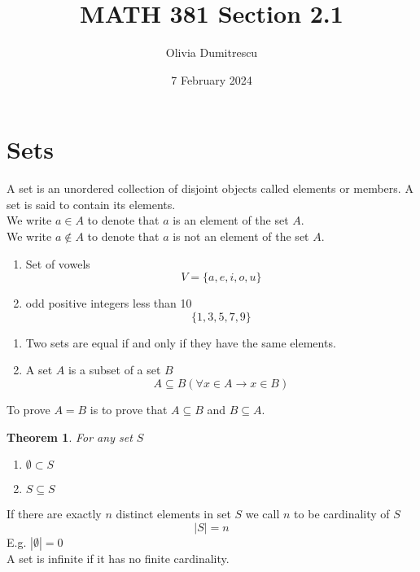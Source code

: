 \documentclass[letterpaper, 12pt]{article}
\title{MATH 381 Section 2.1}
\author{Olivia Dumitrescu}
\date{7 February 2024}
\newtheorem{theorem}{Theorem}[section]
\newenvironment{definition}[1][Definition]{\begin{trivlist}
\item[\hskip \labelsep {\bfseries #1}]}{\end{trivlist}}
\newenvironment{example}[1][Example]{\begin{trivlist}
\item[\hskip \labelsep {\bfseries #1}]}{\end{trivlist}}
\newenvironment{remark}[1][Remark]{\begin{trivlist}
\item[\hskip \labelsep {\bfseries #1}]}{\end{trivlist}}
\newcommand{\then}{\rightarrow}
\begin{document}
    \maketitle
    \section*{Sets}
    \begin{definition}
        A set is an unordered collection of disjoint objects called elements or members.
        A set is said to contain its elements. \\
        We write $a \in A$ to denote that $a$ is an element of the set $A$. \\
        We write $a \notin A$ to denote that $a$ is not an element of the set $A$.
    \end{definition}
    \begin{example}
        \hfil
        \begin{enumerate}
            \item Set of vowels
            \[V = \{a, e, i, o, u\}\]
            \item odd positive integers less than 10
            \[\{1, 3, 5, 7, 9\}\]
        \end{enumerate}
    \end{example}
    \begin{definition}
        \hfill
        \begin{enumerate}
            \item Two sets are equal if and only if they have the same elements.
            \item A set $A$ is a subset of a set $B$
            \[A \subseteq B (\forall x \in A \then x \in B)\]
        \end{enumerate}
    \end{definition}
    \begin{remark}
        To prove $A = B$ is to prove that $A \subseteq B$ and $B \subseteq A$.
    \end{remark}
    \begin{theorem}
        For any set $S$
        \begin{enumerate}
            \item $\emptyset \subset S$
            \item $S \subseteq S$
        \end{enumerate}
    \end{theorem}
    \begin{definition}
        If there are exactly $n$ distinct elements in set $S$ we call $n$ to be cardinality of $S$
        \[|S| = n\]
        E.g. $|\emptyset| = 0$ \\
        A set is infinite if it has no finite cardinality.
    \end{definition}
\end{document}
